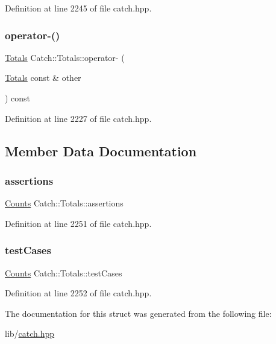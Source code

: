 Definition at line 2245 of file catch.\+hpp.

\hypertarget{struct_catch_1_1_totals_a9279ed39139cb7e7b291918a6d08290e}{}\label{struct_catch_1_1_totals_a9279ed39139cb7e7b291918a6d08290e} 
\subsubsection{\texorpdfstring{operator-\/()}{operator-()}}
{\footnotesize\ttfamily \hyperlink{struct_catch_1_1_totals}{Totals} Catch\+::\+Totals\+::operator-\/ (\begin{DoxyParamCaption}\item[{\hyperlink{struct_catch_1_1_totals}{Totals} const \&}]{other }\end{DoxyParamCaption}) const\hspace{0.3cm}{\ttfamily [inline]}}



Definition at line 2227 of file catch.\+hpp.



\subsection{Member Data Documentation}
\hypertarget{struct_catch_1_1_totals_a885ded66df752147b30c3d45aa602ec9}{}\label{struct_catch_1_1_totals_a885ded66df752147b30c3d45aa602ec9} 
\subsubsection{\texorpdfstring{assertions}{assertions}}
{\footnotesize\ttfamily \hyperlink{struct_catch_1_1_counts}{Counts} Catch\+::\+Totals\+::assertions}



Definition at line 2251 of file catch.\+hpp.

\hypertarget{struct_catch_1_1_totals_adb195fe477aedee2ecea88c888f16506}{}\label{struct_catch_1_1_totals_adb195fe477aedee2ecea88c888f16506} 
\subsubsection{\texorpdfstring{test\+Cases}{testCases}}
{\footnotesize\ttfamily \hyperlink{struct_catch_1_1_counts}{Counts} Catch\+::\+Totals\+::test\+Cases}



Definition at line 2252 of file catch.\+hpp.



The documentation for this struct was generated from the following file\+:\begin{DoxyCompactItemize}
\item 
lib/\hyperlink{catch_8hpp}{catch.\+hpp}\end{DoxyCompactItemize}
